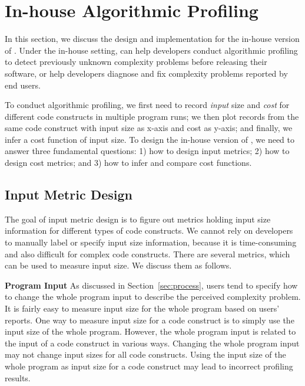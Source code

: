 
\section{In-house Algorithmic Profiling}
\label{sec:inhouse}

In this section, we discuss the design and implementation for the in-house version of \Tool.
Under the in-house setting, 
\Tool can help developers conduct algorithmic profiling to detect 
previously unknown complexity problems before releasing their software, 
or help developers diagnose and fix complexity problems reported by end users. 

To conduct algorithmic profiling,
we first need to record \textit{input} size and \textit{cost} for different code constructs 
in multiple program runs;
we then plot records from the same code construct with input size as x-axis and cost as y-axis; 
and finally, we infer a cost function of input size.
To design the in-house version of \Tool, 
we need to answer three fundamental questions:
1) how to design input metrics; 
2) how to design cost metrics;
and 3) how to infer and compare cost functions. 

\subsection{Input Metric Design}
\label{sec:input}

The goal of input metric design is to figure out metrics
holding input size information for different types of code constructs. 
We cannot rely on developers to manually label or specify input size information, 
because it is time-consuming and also difficult for complex code constructs.  
There are several metrics, which can be used to measure input size.
We discuss them as follows. 

\noindent\textbf{Program Input}
As discussed in Section~\ref{sec:process}, 
users tend to specify how to change the whole program 
input to describe the perceived complexity problem.
It is fairly easy to measure input size for the whole program based on users' reports.
One way to measure input size for a code construct
is to simply use the input size of the whole program. 
However, the whole program input 
is related to the input of a code construct in various ways.
Changing the whole program input may not change input sizes for 
all code constructs. 
Using the input size of the whole program as input size for a code 
construct may lead to incorrect profiling results. 

